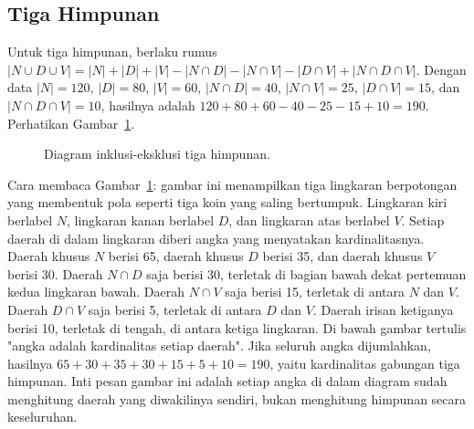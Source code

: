 \documentclass[11pt,a4paper]{article}
\begin{document}
\subsection{Tiga Himpunan}

Untuk tiga himpunan, berlaku rumus $|N \cup D \cup V|=|N|+|D|+|V|-|N \cap D|-|N \cap V|-|D \cap V|+|N \cap D \cap V|$. Dengan data $|N|=120$, $|D|=80$, $|V|=60$, $|N \cap D|=40$, $|N \cap V|=25$, $|D \cap V|=15$, dan $|N \cap D \cap V|=10$, hasilnya adalah $120+80+60-40-25-15+10=190$. Perhatikan Gambar~\ref{fig:tiga-himpunan}.

\begin{figure}[H]
	\centering
	\caption{Diagram inklusi-eksklusi tiga himpunan.}
	\label{fig:tiga-himpunan}
\end{figure}

Cara membaca Gambar~\ref{fig:tiga-himpunan}: gambar ini menampilkan tiga lingkaran berpotongan yang membentuk pola seperti tiga koin yang saling bertumpuk. Lingkaran kiri berlabel $N$, lingkaran kanan berlabel $D$, dan lingkaran atas berlabel $V$. Setiap daerah di dalam lingkaran diberi angka yang menyatakan kardinalitasnya. Daerah khusus $N$ berisi 65, daerah khusus $D$ berisi 35, dan daerah khusus $V$ berisi 30. Daerah $N \cap D$ saja berisi 30, terletak di bagian bawah dekat pertemuan kedua lingkaran bawah. Daerah $N \cap V$ saja berisi 15, terletak di antara $N$ dan $V$. Daerah $D \cap V$ saja berisi 5, terletak di antara $D$ dan $V$. Daerah irisan ketiganya berisi 10, terletak di tengah, di antara ketiga lingkaran. Di bawah gambar tertulis "angka adalah kardinalitas setiap daerah". Jika seluruh angka dijumlahkan, hasilnya $65+30+35+30+15+5+10=190$, yaitu kardinalitas gabungan tiga himpunan. Inti pesan gambar ini adalah setiap angka di dalam diagram sudah menghitung daerah yang diwakilinya sendiri, bukan menghitung himpunan secara keseluruhan.
\end{document}
